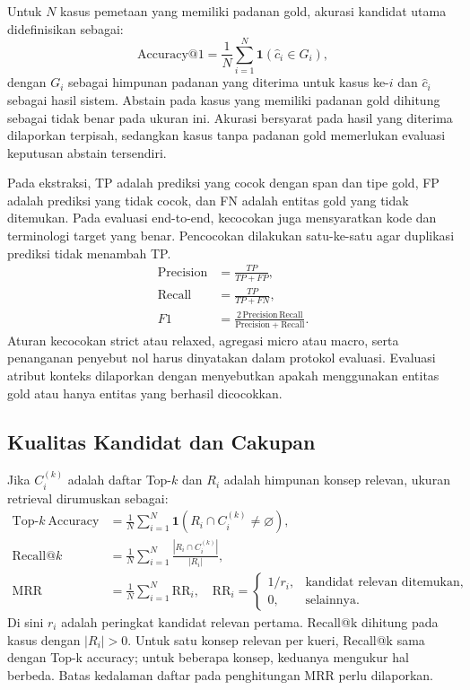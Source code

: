 Untuk $N$ kasus pemetaan yang memiliki padanan gold, akurasi kandidat utama didefinisikan sebagai:
\begin{equation}
 \mathrm{Accuracy@1}=\frac{1}{N}\sum_{i=1}^{N}\mathbf{1}(\widehat{c}_i\in G_i),
 \label{eq:accuracy}
\end{equation}
 dengan $G_i$ sebagai himpunan padanan yang diterima untuk kasus ke-$i$ dan $\widehat{c}_i$ sebagai hasil sistem. Abstain pada kasus yang memiliki padanan gold dihitung sebagai tidak benar pada ukuran ini. Akurasi bersyarat pada hasil yang diterima dilaporkan terpisah, sedangkan kasus tanpa padanan gold memerlukan evaluasi keputusan abstain tersendiri.

Pada ekstraksi, TP adalah prediksi yang cocok dengan span dan tipe gold, FP adalah prediksi yang tidak cocok, dan FN adalah entitas gold yang tidak ditemukan. Pada evaluasi end-to-end, kecocokan juga mensyaratkan kode dan terminologi target yang benar. Pencocokan dilakukan satu-ke-satu agar duplikasi prediksi tidak menambah TP.
\begin{align}
 \mathrm{Precision}&=\frac{TP}{TP+FP},\label{eq:precision}\\
 \mathrm{Recall}&=\frac{TP}{TP+FN},\label{eq:recall}\\
 F1&=\frac{2\,\mathrm{Precision}\,\mathrm{Recall}}{\mathrm{Precision}+\mathrm{Recall}}.\label{eq:f1score}
\end{align}
 Aturan kecocokan strict atau relaxed, agregasi micro atau macro, serta penanganan penyebut nol harus dinyatakan dalam protokol evaluasi. Evaluasi atribut konteks dilaporkan dengan menyebutkan apakah menggunakan entitas gold atau hanya entitas yang berhasil dicocokkan.

\subsection{Kualitas Kandidat dan Cakupan}

Jika $C_i^{(k)}$ adalah daftar Top-$k$ dan $R_i$ adalah himpunan konsep relevan, ukuran retrieval dirumuskan sebagai:
\begin{align}
 \mathrm{Top\text{-}}k\ \mathrm{Accuracy}&=\frac{1}{N}\sum_{i=1}^{N}\mathbf{1}\!\left(R_i\cap C_i^{(k)}\neq\varnothing\right),\label{eq:topk}\\
 \mathrm{Recall@}k&=\frac{1}{N}\sum_{i=1}^{N}\frac{|R_i\cap C_i^{(k)}|}{|R_i|},\label{eq:recallatk}\\
 \mathrm{MRR}&=\frac{1}{N}\sum_{i=1}^{N}\mathrm{RR}_i,\quad
 \mathrm{RR}_i=\begin{cases}1/r_i,&\text{kandidat relevan ditemukan},\\0,&\text{selainnya}.\end{cases}\label{eq:mrr}
\end{align}
 Di sini $r_i$ adalah peringkat kandidat relevan pertama. Recall@k dihitung pada kasus dengan $|R_i|>0$. Untuk satu konsep relevan per kueri, Recall@k sama dengan Top-k accuracy; untuk beberapa konsep, keduanya mengukur hal berbeda. Batas kedalaman daftar pada penghitungan MRR perlu dilaporkan.

